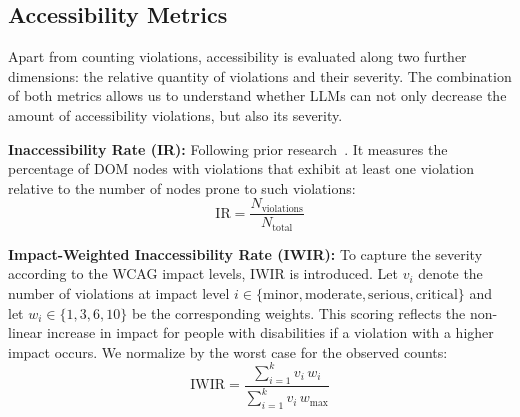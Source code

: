 \subsection{Accessibility Metrics}
Apart from counting violations, accessibility is evaluated along two
further dimensions: the relative quantity of violations and their 
severity. The combination of both metrics allows us to understand 
whether LLMs can not only decrease
the amount of accessibility violations, but also its severity.

\textbf{Inaccessibility Rate (IR):} Following prior
research~\parencite{alshayban2020accessibility}. It measures the 
percentage of DOM nodes with violations that exhibit at least one violation
relative to the number of nodes prone to such violations:
\begin{equation}
    \mathrm{IR} = \frac{N_{\mathrm{violations}}}{N_{\mathrm{total}}}
\end{equation}

\textbf{Impact-Weighted Inaccessibility Rate (IWIR):}
To capture the severity according to the WCAG impact levels, IWIR
is introduced. Let $v_i$ denote the number of violations at impact 
level $i \in \{\text{minor}, \text{moderate}, \text{serious}, 
\text{critical}\}$ and let $w_i \in \{1,3,6,10\}$ be the corresponding 
weights. This scoring reflects the non-linear increase 
in impact for people with disabilities if a violation with a higher
impact occurs.
We normalize by the worst case for the observed counts:
\begin{equation}
  \mathrm{IWIR} = 
    \frac{\displaystyle\sum_{i=1}^{k} v_i \, w_i}
         {\displaystyle\sum_{i=1}^{k} v_i \, w_{\mathrm{max}}}
  \label{eq:iwir}
\end{equation}







